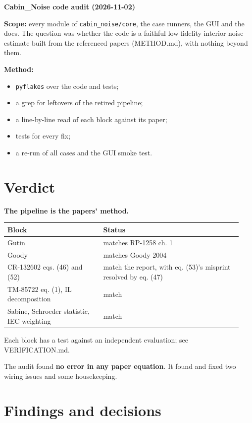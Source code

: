 \documentclass[10pt,a4paper]{article}
\begin{document}
{\LARGE\bfseries Cabin\_Noise code audit (2026-11-02)\par}\bigskip

\textbf{Scope:} every module of \texttt{cabin\_\allowbreak{}noise/\allowbreak{}core}, the case runners, the GUI and the docs. The question was whether the code is a faithful low-fidelity interior-noise estimate built from the referenced papers (METHOD.md), with nothing beyond them.

\textbf{Method:}

\begin{itemize}
\item \texttt{pyflakes} over the code and tests;
\item a grep for leftovers of the retired pipeline;
\item a line-by-line read of each block against its paper;
\item tests for every fix;
\item a re-run of all cases and the GUI smoke test.
\end{itemize}

\section*{Verdict}

\textbf{The pipeline is the papers' method.}

{\small
\begin{longtable}{>{\raggedright\arraybackslash}p{0.383\linewidth}>{\raggedright\arraybackslash}p{0.557\linewidth}}
\hline
\textbf{Block} & \textbf{Status} \\
\hline
\endhead
Gutin & matches RP-1258 ch. 1 \\
Goody & matches Goody 2004 \\
CR-132602 eqs. (46) and (52) & match the report, with eq. (53)'s misprint resolved by eq. (47) \\
TM-85722 eq. (1), IL decomposition & match \\
Sabine, Schroeder statistic, IEC weighting & match \\
\hline
\end{longtable}}

Each block has a test against an independent evaluation; see VERIFICATION.md.

The audit found \textbf{no error in any paper equation}. It found and fixed two wiring issues and some housekeeping.

\section*{Findings and decisions}
\end{document}
